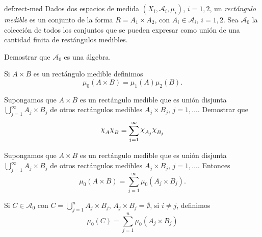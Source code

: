 \begin{definicion}{def:rect-med}
 Dados dos espacios de medida $(X_i,\mathscr{A}_i,\mu_i)$, $i=1,2$, un \emph{rectángulo medible} es un conjunto de la forma $R=A_1\times A_2$, con $A_i\in\mathscr{A}_i$, $i=1,2$. Sea $\mathscr{A}_0$  la colección de todos los conjuntos que se pueden expresar como unión de una cantidad finita de restángulos medibles. 
\end{definicion}

\begin{ejercicio}{} Demostrar que $\mathscr{A}_0$ es una álgebra.
\end{ejercicio}




\begin{definicion}{} Si  $A\times B$ es un rectángulo medible definimos 
\[
 \mu_0(A\times B)=\mu_1(A)\mu_2(B).
\]
\end{definicion}




\begin{ejercicio}{} Supongamos que $A\times B$ es un rectángulo medible que es unión disjunta $\bigcup\limits_{j=1}^{\infty}A_j\times B_j$ de otros rectángulos medibles $A_j\times B_j$, $j=1,\ldots$.  Demostrar que 
\begin{equation}\label{eq:chis_prod}
 \rchi_{A}\rchi_{B}=\sum\limits_{j=1}^{\infty} \rchi_{A_j}\rchi_{B_j} 
\end{equation}

\end{ejercicio}

\begin{proposicion}{} Supongamos que $A\times B$ es un rectángulo medible que es unión disjunta $\bigcup\limits_{j=1}^{\infty}A_j\times B_j$ de otros rectángulos medibles $A_j\times B_j$, $j=1,\ldots$.  Entonces
\begin{equation}\label{eq:chis_prod}
 \mu_0(A\times B)=\sum\limits_{j=1}^{\infty} \mu_0(A_j\times B_j). 
\end{equation}

\end{proposicion}


\begin{definicion}{}
Si $C\in\mathscr{A}_0$ con $C=\bigcup\limits_{j=1}^{n}A_j\times B_j$, $A_j\times B_j=\emptyset$, si $i\neq j$, definimos 
\[
 \mu_0(C)=\sum\limits_{j=1}^{n}\mu_0(A_j\times B_j)
\]

\end{definicion}





